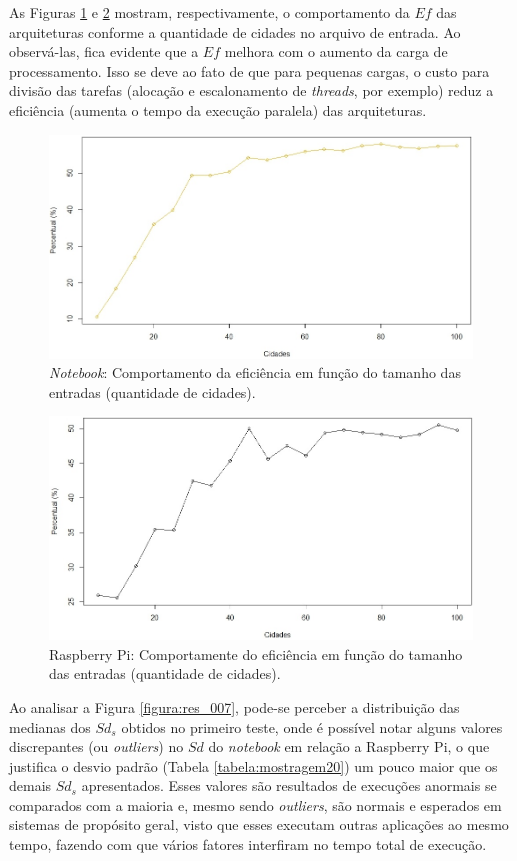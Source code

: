 As Figuras \ref{figura:res_005} e \ref{figura:res_006} mostram, respectivamente, o comportamento da $Ef$ das arquiteturas conforme a quantidade de cidades no arquivo de entrada. Ao observá-las, fica evidente que a $Ef$ melhora com o aumento da carga de processamento. Isso se deve ao fato de que para pequenas cargas, o custo para divisão das tarefas (alocação e escalonamento de \textit{threads}, por exemplo) reduz a eficiência (aumenta o tempo da execução paralela) das arquiteturas.

\begin{figure}[htb]  
	\centering
	\includegraphics[width=.69\textwidth]{figuras/res_005_20efnt}
	\caption[\textit{Notebook}: eficiência]{\textit{Notebook}: Comportamento da eficiência em função do tamanho das entradas (quantidade de cidades).}
	\label{figura:res_005}
\end{figure} 

\begin{figure}[htb]  
	\centering
	\includegraphics[width=.69\textwidth]{figuras/res_006_20efrp}
	\caption[Raspberry Pi: eficiância]{Raspberry Pi: Comportamente do eficiência em função do tamanho das entradas (quantidade de cidades).}
	\label{figura:res_006}
\end{figure} 

Ao analisar a Figura \ref{figura:res_007}, pode-se perceber a distribuição das medianas dos $Sd_s$ obtidos no primeiro teste, onde é possível notar alguns valores discrepantes (ou \textit{outliers}) no $Sd$ do \textit{notebook} em relação a Raspberry Pi, o que justifica o desvio padrão (Tabela \ref{tabela:mostragem20}) um pouco maior que os demais $Sd_s$ apresentados. Esses valores são resultados de execuções anormais se comparados com a maioria e, mesmo sendo \textit{outliers}, são normais e esperados em sistemas de propósito geral, visto que esses executam outras aplicações ao mesmo tempo, fazendo com que vários fatores interfiram no tempo total de execução.

